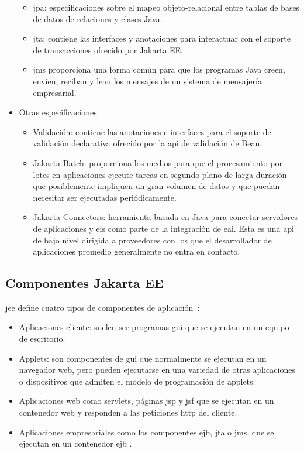 \begin{itemize}
\begin{itemize}
        \item \acrfull{jpa}: especificaciones sobre el mapeo objeto-relacional entre tablas de bases de datos de relaciones y clases Java.
        \item \acrfull{jta}: contiene las interfaces y anotaciones para interactuar con el soporte de transacciones ofrecido por Jakarta EE.
	    \item \acrfull{jms} proporciona una forma común para que los programas Java creen, envíen, reciban y lean los mensajes de un sistema de mensajería empresarial.      
     \end{itemize}
   \item Otras especificaciones
     \begin{itemize}
        \item Validación: contiene las anotaciones e interfaces para el soporte de validación declarativa ofrecido por la \acrshort{api} de validación de Bean. 
		\item Jakarta Batch: proporciona los medios para que el procesamiento por lotes en aplicaciones ejecute tareas en segundo plano de larga duración que posiblemente impliquen un gran volumen de datos y que puedan necesitar ser ejecutadas periódicamente. 
		\item Jakarta Connectors: herramienta basada en Java para conectar servidores de aplicaciones y \acrfull{eis} como parte de la integración de \acrshort{eai}. Esta es una \acrshort{api} de bajo nivel dirigida a proveedores con los que el desarrollador de aplicaciones promedio generalmente no entra en contacto.
     \end{itemize}
\end{itemize}




\subsection{Componentes Jakarta EE}
\label{sec:componentes}
\acrshort{jee} define cuatro tipos de componentes de aplicación~\cite{jee}: 

\begin{itemize}
   \item Aplicaciones cliente: suelen ser programas \acrfull{gui} que se ejecutan en un equipo de escritorio.
   \item Applets: son componentes de \acrshort{gui} que normalmente se ejecutan en un navegador web, pero pueden ejecutarse en una variedad de otras aplicaciones o dispositivos que admiten el modelo de programación de applets. 
   \item Aplicaciones web como servlets, páginas \acrfull{jsp} y \acrshort{jsf} que se ejecutan en un contenedor web y responden a las peticiones \acrshort{http} del cliente.
   \item Aplicaciones empresariales como los componentes \acrshort{ejb}, \acrshort{jta} o \acrshort{jms}, que se ejecutan en un contenedor \acrshort{ejb} .
\end{itemize}



